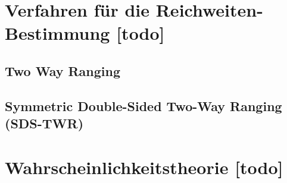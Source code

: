 \section{Verfahren für die Reichweiten-Bestimmung [todo]}




\subsection{Two Way Ranging}
\subsection{Symmetric Double-Sided Two-Way Ranging (SDS-TWR)}








\begin{comment}
------------------------------------------------------------------------------------------
- Theorie: Wahrscheinlichkeitsverfahren
	- Positionsschätzer in Form einer Wahrscheinlichkeitsverteilung über den Zustandraum.
	- Kalman fitering
		- Multivariate Gaussian distribution (Mehrdimensionale Normalverteilung)
		- \url{https://de.wikipedia.org/wiki/Mehrdimensionale_Normalverteilung}
		- Kompakte Beschreibung der Normalverteilung über den Erwartungswert $\mu$ und die Kovarianzmatrix $\Sigma$ ($\mu$ und $\sigma^2$)
		- \url{https://matheguru.com/stochastik/normalverteilung.html}
	- Markov methods
		- Probability Grid
		- Robot--Position ist diskretisiert
		- Nutzen von Bayes Rule um Grids zu kombinieren/neuerzeugen
	- Monte Carlo Lokalisierung
		- Multimodal Distribution for position estimation
		- Important Sampling
\end{comment}
\section{Wahrscheinlichkeitstheorie [todo]}


\begin{comment}
------------------------------------------------------------------------------------------
- Theorie: Lokalisierungsprobleme
	- Statische Lokalisierung
		- Akkurate Schätzung seiner globalen Position anhand der Sensordaten
		- Annahme: Umgebungskarte der Landmarken ist vorhanden
	- Position Tracking/Positionsverfolgung
		- Initiale Position ist gegeben
		- Verfogenden der Roboterposition
		- Annahme: Umgebungskarte der Landmarken ist vorhanden
	- SLAM
		- Verwenden der Sensordaten um sich zu Lokalisierung...
		- und eine Karte der Landmarken zu erzeugen.
		- Bisher Winkel und Entferung zu einer Landmarke gegeben
			- Computer Vision, Structure from Motion
		- Hier nur die Entfernung
\end{comment}
